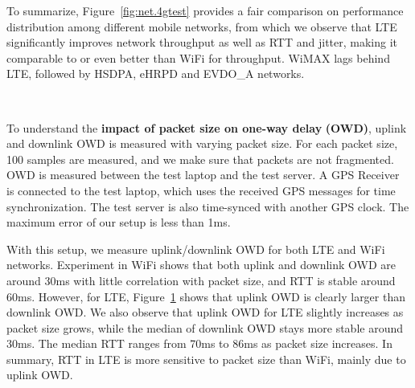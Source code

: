 To summarize, Figure~\ref{fig:net.4gtest} provides a fair comparison on performance distribution among different mobile networks, from which we observe that LTE significantly improves network throughput as well as RTT and jitter, making it comparable to or even better than WiFi for throughput. WiMAX lags behind LTE, followed by HSDPA, eHRPD and EVDO\_A networks.


\label{sec:net.owd}


\begin{figure}[t]
\centering
{} \\
\label{fig:net.len.lte}
\end{figure}


To understand the \textbf{impact of packet size on one-way delay} \textbf{(OWD)}, uplink and downlink OWD is measured with varying packet size. For each packet size, 100 samples are measured, and we make sure that packets are not fragmented. OWD is measured between the test laptop and the test server. A GPS Receiver~\cite{gps} is connected to the test laptop, which uses the received GPS messages for time synchronization. The test server is also time-synced with another GPS clock. The maximum error of our setup is less than 1ms.

With this setup, we measure uplink/downlink OWD for both LTE and WiFi networks.  Experiment in WiFi shows that both uplink and downlink OWD are around 30ms with little correlation with packet size, and RTT is stable around 60ms. However, for LTE, Figure~\ref{fig:net.len.lte} shows that uplink OWD is clearly larger than downlink OWD. We also observe that uplink OWD for LTE slightly increases as packet size grows, while the median of downlink OWD stays more stable around 30ms. The median RTT ranges from 70ms to 86ms as packet size increases. In summary,  RTT in LTE is more sensitive to packet size than WiFi, mainly due to uplink OWD.


